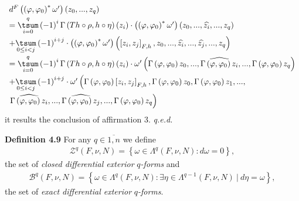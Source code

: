 \documentclass[11pt]{article}
\begin{document}
\begin{equation*}
\begin{array}{l}
d^{F}\left( \left( \varphi ,\varphi _{0}\right) ^{\ast }\omega ^{\prime
}\right) \left( z_{0},...,z_{q}\right) \vspace*{1mm} \\
=\overset{q}{\underset{i=0}{\tsum }}\left( -1\right) ^{i}\Gamma \left(
Th\circ \rho ,h\circ \eta \right) \left( z_{i}\right) \cdot \left( \left(
\varphi ,\varphi _{0}\right) ^{\ast }\omega ^{\prime }\right) \left(
z_{0},...,\widehat{z_{i}},...,z_{q}\right) \vspace*{1mm} \\
+\underset{0\leq i<j}{\tsum }\left( -1\right) ^{i+j}\cdot \left( \left(
\varphi ,\varphi _{0}\right) ^{\ast }\omega ^{\prime }\right) \left( \left[
z_{i},z_{j}\right] _{F,h},z_{0},...,\widehat{z_{i}},...,\widehat{z_{j}}%
,...,z_{q}\right) \vspace*{1mm} \\
=\overset{q}{\underset{i=0}{\tsum }}\left( -1\right) ^{i}\Gamma \left(
Th\circ \rho ,h\circ \eta \right) \left( z_{i}\right) \cdot \omega ^{\prime
}\left( \Gamma \left( \varphi ,\varphi _{0}\right) z_{0},...,\widehat{\Gamma
\left( \varphi ,\varphi _{0}\right) z_{i}},...,\Gamma \left( \varphi
,\varphi _{0}\right) z_{q}\right) \vspace*{1mm} \\
+\underset{0\leq i<j}{\tsum }\left( -1\right) ^{i+j}\cdot \omega ^{\prime
}\left( \Gamma \left( \varphi ,\varphi _{0}\right) \left[ z_{i},z_{j}\right]
_{F,h},\Gamma \left( \varphi ,\varphi _{0}\right) z_{0},\Gamma \left(
\varphi ,\varphi _{0}\right) z_{1},...,\right. \vspace*{1mm} \\
\left. \widehat{\Gamma \left( \varphi ,\varphi _{0}\right) z_{i}},...,%
\widehat{\Gamma \left( \varphi ,\varphi _{0}\right) z_{j}},...,\Gamma \left(
\varphi ,\varphi _{0}\right) z_{q}\right)%
\end{array}%
\end{equation*}%
it results the conclusion of affirmation 3. \hfill \emph{q.e.d.}

\textbf{Definition 4.9} For any $q\in \overline{1,n}$ we define%
\begin{equation*}
\begin{array}{c}
\mathcal{Z}^{q}\left( F,\nu ,N\right) =\left\{ \omega \in \Lambda ^{q}\left(
F,\nu ,N\right) :d\omega =0\right\} ,%
\end{array}%
\end{equation*}%
the set of \emph{closed differential exterior }$q$\emph{-forms} and
\begin{equation*}
\begin{array}{c}
\mathcal{B}^{q}\left( F,\nu ,N\right) =\left\{ \omega \in \Lambda ^{q}\left(
F,\nu ,N\right) :\exists \eta \in \Lambda ^{q-1}\left( F,\nu ,N\right)
~|~d\eta =\omega \right\} ,%
\end{array}%
\end{equation*}%
the set of \emph{exact differential exterior }$q$\emph{-forms}.
\end{document}
